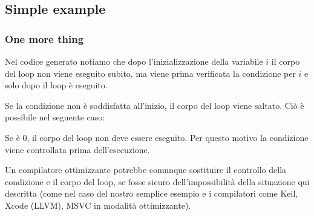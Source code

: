 \subsection{Simple example}





\subsubsection{One more thing}

Nel codice generato notiamo che dopo l'inizializzazione della variabile $i$ il corpo del loop non viene eseguito subito, ma
viene prima verificata la condizione per $i$ e solo dopo il loop è eseguito. 

Se la condizione non è soddisfatta all'inizio, il corpo del loop viene saltato.
Ciò è possibile nel seguente caso:



Se  è 0, il corpo del loop non deve essere eseguito. Per questo motivo la condizione viene
controllata prima dell'esecuzione.

Un compilatore ottimizzante potrebbe comunque sostituire il controllo della condizione e il corpo del loop, se fosse sicuro dell'impossibilità 
della situazione qui descritta (come nel caso del nostro semplice esempio e i compilatori come Keil, Xcode (LLVM), MSVC in modalità ottimizzante).
